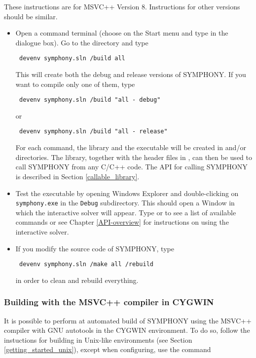 These instructions are for MSVC++ Version 8. Instructions for other versions
should be similar.

\begin{itemize}
\item Open a command terminal (choose  on the Start menu and type
 in the dialogue box). Go to the 
directory and type 
{\color{Brown}
\begin{verbatim}
 devenv symphony.sln /build all
\end{verbatim}
}
This will create both the debug and release versions of SYMPHONY. If you 
want to compile only one of them, type
{\color{Brown}
\begin{verbatim}
 devenv symphony.sln /build "all - debug"
\end{verbatim}
}
or 
{\color{Brown}
\begin{verbatim}
 devenv symphony.sln /build "all - release"
\end{verbatim}
}
For each command, the library  and the executable 
 will be created in  and/or 
directories.  The library, together with the header files in 
, can then be 
used to call SYMPHONY from any C/C++ code. The API for calling SYMPHONY is 
described in Section \ref{callable_library}.

\item Test the executable by opening Windows Explorer and double-clicking
on {\color{Brown}\texttt{symphony.exe}} in the
{\color{Brown}\texttt{Debug\bs}} subdirectory. This should open a Window in
which the interactive solver will appear. Type  or  to see
a list of available commands or see Chapter
\ref{API-overview} for instructions on using the interactive solver.

\item If you modify the source code of SYMPHONY, type 
{\color{Brown}
\begin{verbatim}
 devenv symphony.sln /make all /rebuild
\end{verbatim}
}
in order to clean and rebuild everything.
\end{itemize} 

\subsubsection{Building with the MSVC++ compiler in CYGWIN}

It is possible to perform at automated build of SYMPHONY using the MSVC++
compiler  with GNU autotools in the CYGWIN environment. To do so,
follow the instuctions for building in Unix-like environments (see Section
\ref{getting_started_unix}), except when configuring, use the command

